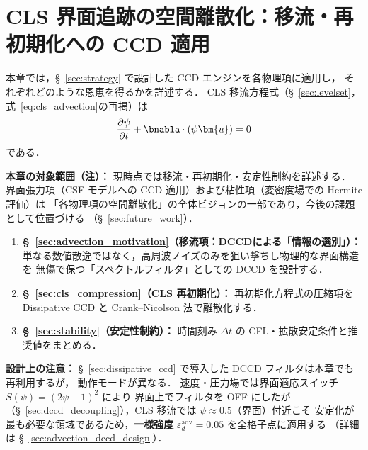 %
%
\section{CLS 界面追跡の空間離散化：移流・再初期化への CCD 適用}
\label{sec:discretization_modules}
\label{sec:advection}%

本章では，§~\ref{sec:strategy} で設計した CCD エンジンを各物理項に適用し，
それぞれどのような恩恵を得るかを詳述する．
CLS 移流方程式（§~\ref{sec:levelset}，式~\eqref{eq:cls_advection}の再掲）は
\begin{equation}
  \frac{\partial\psi}{\partial t} + \bnabla\cdot(\psi\bm{u}) = 0
  \label{eq:cls_advection_ref}
\end{equation}
である．

\noindent\textbf{本章の対象範囲（注）：}
現時点では移流・再初期化・安定性制約を詳述する．
界面張力項（CSF モデルへの CCD 適用）および粘性項（変密度場での Hermite 評価）は
「各物理項の空間離散化」の全体ビジョンの一部であり，今後の課題として位置づける
（§~\ref{sec:future_work}）．

\begin{enumerate}
  \item \textbf{§~\ref{sec:advection_motivation}（移流項：DCCDによる「情報の選別」）：}
        単なる数値散逸ではなく，高周波ノイズのみを狙い撃ちし物理的な界面構造を
        無傷で保つ「スペクトルフィルタ」としての DCCD を設計する．
  \item \textbf{§~\ref{sec:cls_compression}（CLS 再初期化）：}
        再初期化方程式の圧縮項を Dissipative CCD と Crank--Nicolson 法で離散化する．
  \item \textbf{§~\ref{sec:stability}（安定性制約）：}
        時間刻み $\Delta t$ の CFL・拡散安定条件と推奨値をまとめる．
\end{enumerate}

\noindent\textbf{設計上の注意：}
§~\ref{sec:dissipative_ccd} で導入した DCCD フィルタは本章でも再利用するが，
動作モードが異なる．
速度・圧力場では界面適応スイッチ $S(\psi) = (2\psi-1)^2$ により
界面上でフィルタを OFF にしたが（§~\ref{sec:dccd_decoupling}），CLS 移流では $\psi \approx 0.5$（界面）付近こそ
安定化が最も必要な領域であるため，\textbf{一様強度}
$\varepsilon_d^{\mathrm{adv}} = 0.05$ を全格子点に適用する
（詳細は §~\ref{sec:advection_dccd_design}）．

